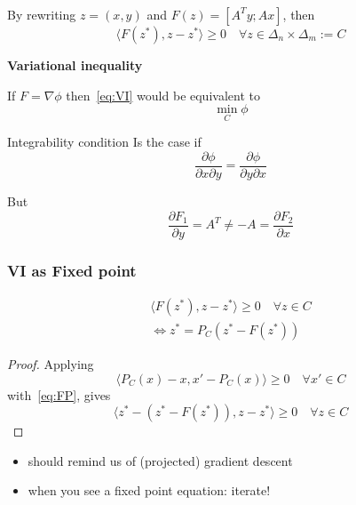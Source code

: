 \documentclass{beamer}
\begin{document}
\begin{frame}
  \frametitle{}
  By rewriting $z=(x,y)$ and $F(z) = [A^T y; Ax]$, then
  \begin{equation}\tag{VI}
    \label{eq:VI}
    \langle F(z^*), z-z^* \rangle \ge 0 \quad \forall z \in \Delta_n \times \Delta_m := C
  \end{equation}
  \begin{center}
    \textbf{Variational inequality}
  \end{center}

  If $F = \nabla \phi$ then~\eqref{eq:VI} would be equivalent to
  \begin{equation}
    \min_C \phi
  \end{equation}
  \begin{block}{Integrability condition}
    Is the case if
    \begin{equation}
      \frac{\partial \phi}{\partial x \partial y} = \frac{\partial \phi}{\partial y \partial x}
    \end{equation}
  \end{block}
  But
  \begin{equation}
    \frac{\partial F_1}{\partial y} = A^T \neq - A = \frac{\partial F_2}{\partial x}
  \end{equation}
\end{frame}


\begin{frame}
  \frametitle{VI as Fixed point}
  \begin{align}
    \langle F(z^*), z-z^* \rangle \ge 0 \quad \forall z \in C \\
    \Leftrightarrow
    z^* = P_C (z^* - F(z^*)) \label{eq:FP}\tag{FP}
  \end{align}
  \begin{proof}
    Applying
    \begin{equation}
      \langle P_C(x)-x, x' - P_C(x) \rangle \ge 0 \quad \forall x' \in C
    \end{equation}
    with~\eqref{eq:FP}, gives
    \begin{equation}
    \langle z^* - (z^* - F(z^*)), z-z^* \rangle \ge 0 \quad \forall z \in C
    \end{equation}
  \end{proof}
  \begin{itemize}
    \item should remind us of (projected) gradient descent
          \item when you see a fixed point equation: iterate!
  \end{itemize}
\end{frame}
\end{document}
